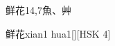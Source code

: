 \begin{entry}{鲜花}{14,7}{⿂、⾋}
  \begin{phonetics}{鲜花}{xian1 hua1}[][HSK 4]
  \end{phonetics}
\end{entry}
